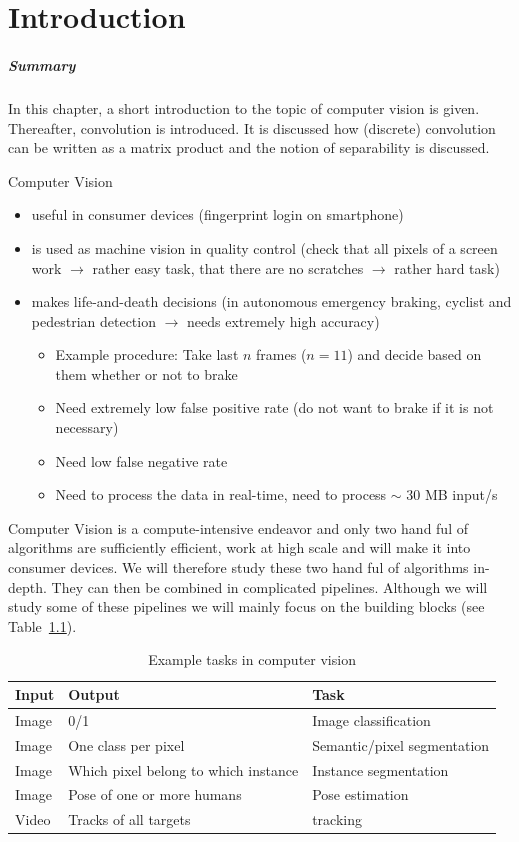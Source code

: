 \chapter{Introduction}
\paragraph{Summary} In this chapter, a short introduction to the topic of
computer vision is given. Thereafter, convolution is introduced. It is discussed
how (discrete) convolution can be written as a matrix product and the notion of
separability is discussed.

Computer Vision
\begin{itemize}
\item useful in consumer devices (\eg fingerprint login on smartphone)
\item is used as machine vision in quality control (\eg check that all pixels of
  a screen work $\rightarrow$ rather easy task, that there are no scratches
  $\rightarrow$ rather hard task)
\item makes life-and-death decisions (\eg in autonomous emergency braking,
  cyclist and pedestrian detection $\rightarrow$ needs extremely high accuracy)
  \begin{itemize}
  \item Example procedure: Take last $n$ frames (\eg $n = 11$) and decide based
    on them whether or not to brake
  \item Need extremely low false positive rate (do not want to brake if it is
    not necessary)
  \item Need low false negative rate
  \item Need to process the data in real-time, \ie need to process $\sim$ 30 MB
    input/s
  \end{itemize}
\end{itemize}
Computer Vision is a compute-intensive endeavor and only two hand ful of
algorithms are sufficiently efficient, \ie work at high scale and will make it
into consumer devices. We will therefore study these two hand ful of algorithms
in-depth. They can then be combined in complicated pipelines. Although we will
study some of these pipelines we will mainly focus on the building blocks (see
Table~\ref{tab:ex:tasks}).

\begin{table}[htpb]
  \centering
  \begin{tabular}{lll}
    \toprule
    Input & Output & Task \\
    \midrule
    Image & 0/1 & Image classification \\
    Image & One class per pixel & Semantic/pixel segmentation \\
    Image & Which pixel belong to which instance & Instance segmentation \\
    Image & Pose of one or more humans & Pose estimation \\
    Video & Tracks of all targets & tracking \\ \bottomrule
  \end{tabular}
  \caption{Example tasks in computer vision}%
  \label{tab:ex:tasks}
\end{table}

